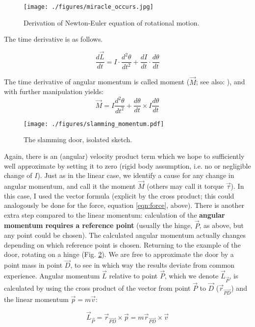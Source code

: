 \begin{figure}[p]
\centering
\texttt{[image: ./figures/miracle\_occurs.jpg]}
\caption{\label{fig:miracle}Derivation of Newton-Euler equation of rotational motion.}
\end{figure}



The time derivative is as follows.
\begin{change}
\[\frac{d\vec{L}}{dt} = I \cdot \frac{d^2 \theta}{d t^2} + \frac{d I}{d t} \cdot \frac{d\theta}{dt}\]
\end{change}

The time derivative of angular momentum is called moment (\(\vec{M}\); see also: \citet{WikipediaNewtonEuler,WikipediaTorque}), and with further manipulation \citep[details in][p. 242, eqn. 8.23; otherwise see Fig. \ref{fig:miracle}]{Lynch2017} yields:
\begin{equation}\label{eqn:moment}
\vec{M} = I \frac{d^2\theta}{dt^2} + \frac{d\theta}{dt} \times I\frac{d\theta}{dt}
\end{equation}



\begin{figure}[p]
\centering
\texttt{[image: ./figures/slamming\_momentum.pdf]}
\caption{\label{fig:slamming_momentum}The slamming door, isolated sketch.}
\end{figure}

Again, there is an (angular) velocity product term which we hope to sufficiently well approximate by setting it to zero (rigid body assumption, i.e. no or negligible change of \(I\)).
Just as in the linear case, we identify a cause for any change in angular momentum, and call it the moment \(\vec{M}\) (others may call it torque \(\vec{\tau}\)).
In this case, I used the vector formula  (explicit by the cross product; this could analogously be done for the force, equation \eqref{eqn:force}, above).
There is another extra step compared to the linear momentum: calculation of the \textbf{angular momentum requires a reference point} (usually the hinge, \(\vec{P}\), as above, but any point could be chosen).
The calculated angular momentum actually changes depending on which reference point is chosen.
Returning to the example of the door, rotating on a hinge (Fig. \ref{fig:slamming_momentum}).
We are free to approximate the door by a point mass in point \(\vec{D}\), to see in which way the results deviate from common experience.
Angular momentum \(\vec{L}\) relative to point \(\vec{P}\), which we denote \(\vec{L}_{\vec{P}}\), is calculated by using the cross product of the vector from point \(\vec{P}\) to \(\vec{D}\) (\(\vec{r}_{\vec{PD}}\)) and the linear momentum \(\vec{p}=m\vec{v}\):
\begin{change}
\[\vec{L}_{\vec{P}} = \vec{r}_{\vec{PD}} \times \vec{p} = m \vec{r}_{\vec{PD}} \times \vec{v} \]
\end{change}

